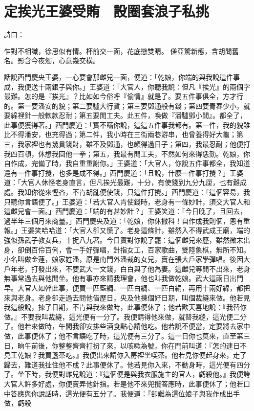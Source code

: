 %

\chapter{定挨光王婆受賄　設圈套浪子私挑}

\begin{showcontents}{}

詩曰：

乍對不相識，徐思似有情。杯前交一面，花底戀雙睛。
傞亞驚新態，含胡問舊名。影含今夜燭，心意幾交橫。

話說西門慶央王婆，一心要會那雌兒一面，便道：「乾娘，你端的與我說這件事成，我便送十兩銀子與你。」王婆道：「大官人，你聽我說：但凡『挨光』的兩個字最難。怎的是『挨光』？比如如今俗呼『偷情』就是了。要五件事俱全，方才行的。第一要潘安的貌；第二要驢大行貨；第三要鄧通般有錢；第四要青春少小，就要綿裡針一般軟款忍耐；第五要閒工夫。此五件，喚做『潘驢鄧小閒』。都全了，此事便獲得著。」西門慶道：「實不瞞你說，這這五件事我都有。第一件，我的貌雖比不得潘安，也充得過；第二件，我小時在三街兩巷游串，也曾養得好大龜；第三，我家裡也有幾貫錢財，雖不及鄧通，也頗得過日子；第四，我最忍耐；他便打我四百頓，休想我回他一拳；第五，我最有閒工夫，不然如何來得恁勤。乾娘，你自作成，完備了時，我自重重謝你。」王婆道：「大官人，你說五件事都全，我知道還有一件事打攪，也多是成不得。」西門慶道：「且說，什麼一件事打攪？」王婆道：「大官人休怪老身直言，但凡挨光最難，十分，有使錢到九分九厘，也有難成處。我知你從來慳吝，不肯胡亂便使錢，只這件打攪。」西門慶道：「這個容易，我只聽你言語便了。」王婆道：「若大官人肯使錢時，老身有一條妙計，須交大官人和這雌兒會一面。」西門慶道：「端的有甚妙計？」王婆笑道：「今日晚了，且回去，過半年三個月來商量。」西門慶央及道：「乾娘，你休撒科！自作成我則個，恩有重報。」王婆笑哈哈道：「大官人卻又慌了。老身這條計，雖然入不得武成王廟，端的強似孫武子教女兵，十捉八九著。今日實對你說了罷：這個雌兒來歷，雖然微末出身，卻倒百伶百俐，會一手好彈唱，針指女工，百家歌曲，雙陸象棋，無所不知。小名叫做金蓮，娘家姓潘，原是南門外潘裁的女兒，賣在張大戶家學彈唱。後因大戶年老，打發出來，不要武大一文錢，白白與了他為妻。這雌兒等閒不出來，老身無事常過去與他閒坐。他有事亦來請我理會，他也叫我做乾娘。武大這兩日出門早。大官人如幹此事，便買一匹藍綢、一匹白綢、一匹白絹，再用十兩好綿，都把來與老身。老身卻走過去問他借歷日，央及他揀個好日期，叫個裁縫來做。他若見我這般說，揀了日期，不肯與我來做時，此事便休了；他若歡天喜地說：『我替你做。』不要我叫裁縫，這光便有一分了。我便請得他來做，就替我縫，這光便二分了。他若來做時，午間我卻安排些酒食點心請他吃。他若說不便當，定要將去家中做，此事便休了；他不言語吃了時，這光便有三分了。這一日你也莫來，直至第三日，晌午前後，你整整齊齊打扮了來，以咳嗽為號，你在門前叫道：『怎的連日不見王乾娘？我買盞茶吃。』我便出來請你入房裡坐喫茶。他若見你便起身來，走了歸去，難道我扯住他不成？此事便休了。他若見你入來，不動身時，這光便有四分了。坐下時，我便對雌兒說道：『這個便是與我衣服施主的官人，虧殺他。』我便誇大官人許多好處，你便賣弄他針指。若是他不來兜攬答應時，此事便休了；他若口中答應與你說話時，這光便有五分了。我便道：『卻難為這位娘子與我作成出手做，虧殺
\end{showcontents}
